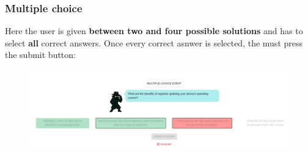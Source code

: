 \subsubsection{Multiple choice}
Here the user is given \textbf{between two and four possible solutions} and has to select \textbf{all} correct answers. Once every
correct asnwer is selected, the must press the submit button:
\begin{figure}[htbp]
    \centering
    \includegraphics[width=1\textwidth]{images/Multiple_Choice.png}
\end{figure}

